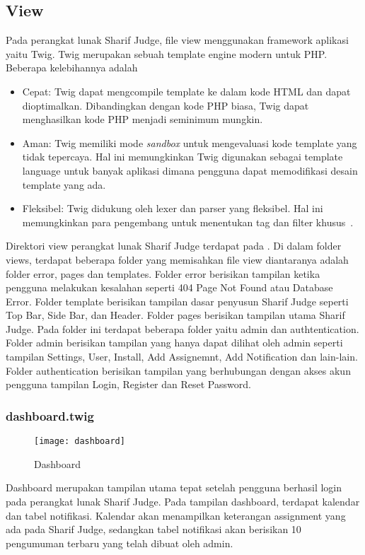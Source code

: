 \subsection{View}
Pada perangkat lunak Sharif Judge, file view menggunakan framework aplikasi yaitu Twig. Twig merupakan sebuah template engine modern untuk PHP. Beberapa kelebihannya adalah
\begin{itemize}
	\item Cepat: Twig dapat mengcompile template ke dalam kode HTML dan dapat dioptimalkan. Dibandingkan dengan kode PHP biasa, Twig dapat menghasilkan kode PHP menjadi seminimum mungkin.
	\item Aman: Twig memiliki mode \textit{sandbox} untuk mengevaluasi kode template yang tidak tepercaya. Hal ini memungkinkan Twig digunakan sebagai template language untuk banyak aplikasi dimana pengguna dapat memodifikasi desain template yang ada.
	\item Fleksibel: Twig didukung oleh lexer dan parser yang fleksibel. Hal ini memungkinkan para pengembang untuk menentukan tag dan filter khusus~\cite{fabien:09:twig}.
\end{itemize}

Direktori view perangkat lunak Sharif Judge terdapat pada . Di dalam folder views, terdapat beberapa folder yang memisahkan file view diantaranya adalah folder error, pages dan templates. Folder error berisikan tampilan ketika pengguna melakukan kesalahan seperti 404 Page Not Found atau Database Error. Folder template berisikan tampilan dasar penyusun Sharif Judge seperti Top Bar, Side Bar, dan Header. Folder pages berisikan tampilan utama Sharif Judge. Pada folder ini terdapat beberapa folder yaitu admin dan authtentication. Folder admin berisikan tampilan yang hanya dapat dilihat oleh admin seperti tampilan Settings, User, Install, Add Assignemnt, Add Notification dan lain-lain. Folder authentication berisikan tampilan yang berhubungan dengan akses akun pengguna tampilan Login, Register dan Reset Password.

\subsubsection{dashboard.twig}
\begin{figure}[H]
	\centering  
	\texttt{[image: dashboard]}  
	\caption[Dashboard]{Dashboard} 
	\label{fig:dashboard} 
\end{figure} 
Dashboard merupakan tampilan utama tepat setelah pengguna berhasil login pada perangkat lunak Sharif Judge. Pada tampilan dashboard, terdapat kalendar dan tabel notifikasi. Kalendar akan menampilkan keterangan assignment yang ada pada Sharif Judge, sedangkan tabel notifikasi akan berisikan 10 pengumuman terbaru yang telah dibuat oleh admin.

